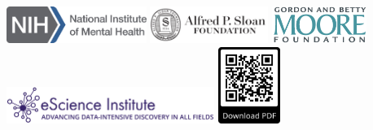 \documentclass[a0paper,landscape,fontscale=0.385]{baposter}
\begin{document}
\begin{poster}
{\begin{multicols}{2}
\smaller %
\includegraphics[height=1.2cm]{logos/nimh-logo.png}
\hspace{1em} \includegraphics[height=1.2cm]{logos/SloanLogo.png}
\includegraphics[height=1.2cm]{logos/MooreFdn.png}
\hspace{6.5em} \includegraphics[height=1.2cm]{logos/eSciencelogo.png}
\columnbreak
\hfill
\includegraphics[height=2.5cm]{qr.png}
\end{multicols}
}



\end{poster}
\end{document}
